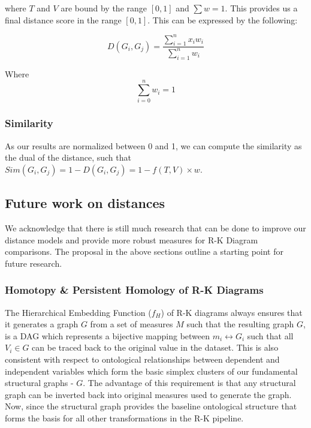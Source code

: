 where $T$ and $V$ are bound by the range $[0,1]$ and $\sum{w} = 1$. This provides us a final distance score in the range $[0,1]$. This can be expressed by the following:

\begin{equation}
D(G_{i}, G_{j}) = \frac{\sum_{i=1}^{n}x_{i}w_{i}}{\sum_{i=1}^{n}w_{i}}
\end{equation} \cite{Salleh1_et_al}

Where
\begin{equation}
\sum_{i=0}^{n}{w_{i}} = 1
\end{equation}
\subsubsection{Similarity}
\label{subsec:similarity}

As our results are normalized between 0 and 1, we can compute the similarity as the dual of the distance, such that $Sim(G_{i}, G_{j}) = 1-D(G_{i}, G_{j}) = 1-f(T,V)\times{w}$.

\subsection{Future work on distances}
\label{subsec:future_distance_work}
We acknowledge that there is still much research that can be done to improve our distance models and provide more robust measures for R-K Diagram comparisons. The proposal in the above sections outline a starting point for future research.

\subsubsection{Homotopy \& Persistent Homology of R-K Diagrams}
The  Hierarchical Embedding Function ($f_{H}$) of R-K diagrams always ensures that it generates a graph $G$ from a set of measures $M$ such that the resulting graph $G$, is a DAG which represents a bijective mapping between $m_{i} \longleftrightarrow G_{i}$ such that all $V_{i} \in G$ can be traced back to the original value in the dataset. This is also consistent with respect to ontological relationships between dependent and independent variables which form the basic simplex clusters of our fundamental structural graphs - $G$. The advantage of this requirement is that any structural graph can be inverted back into original measures used to generate the graph. Now, since the structural graph provides the baseline ontological structure that forms the basis for all other transformations in the R-K pipeline.

